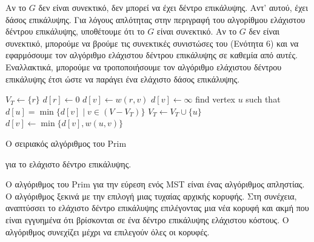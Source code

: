 \documentclass[12pt,a4paper]{article} %
\begin{document}
Αν το $G$ δεν είναι συνεκτικό, δεν μπορεί να έχει δέντρο επικάλυψης. Αντ’ αυτού, έχει δάσος επικάλυψης. Για λόγους απλότητας στην περιγραφή του αλγορίθμου ελάχιστου δέντρου επικάλυψης, υποθέτουμε ότι το $G$ είναι συνεκτικό. Αν το $G$ δεν είναι συνεκτικό, μπορούμε να βρούμε τις συνεκτικές συνιστώσες του (Ενότητα 6) και να εφαρμόσουμε τον αλγόριθμο ελάχιστου δέντρου επικάλυψης σε καθεμία από αυτές. Εναλλακτικά, μπορούμε να τροποποιήσουμε τον αλγόριθμο ελάχιστου δέντρου επικάλυψης έτσι ώστε να παράγει ένα ελάχιστο δάσος επικάλυψης.

\begin{algorithm}[H]
\begin{algorithmic}[1]
    \State $V_T \gets \{r\}$
    \State $d[r] \gets 0$
            \State $d[v] \gets w(r, v)$
        \Else
            \State $d[v] \gets \infty$
        \EndIf
    \EndFor
        \State find vertex $u$ such that $d[u] = \min\{d[v] \mid v \in (V - V_T)\}$
        \State $V_T \gets V_T \cup \{u\}$
            \State $d[v] \gets \min\{d[v], w(u, v)\}$
        \EndFor
    \EndWhile
\EndProcedure
\end{algorithmic}
\end{algorithm}

{\raggedright{} Ο σειριακός αλγόριθμος του Prim} για το ελάχιστο δέντρο επικάλυψης.\label{alg:prim}\par



\vspace{1cm}
Ο αλγόριθμος του Prim για την εύρεση ενός MST είναι ένας αλγόριθμος απληστίας. Ο αλγόριθμος ξεκινά με την επιλογή μιας τυχαίας αρχικής κορυφής. Στη συνέχεια, αναπτύσσει το ελάχιστο δέντρο επικάλυψης επιλέγοντας μια νέα κορυφή και ακμή που είναι εγγυημένα ότι βρίσκονται σε ένα δέντρο επικάλυψης ελάχιστου κόστους. Ο αλγόριθμος συνεχίζει μέχρι να επιλεγούν όλες οι κορυφές.
\end{document}
